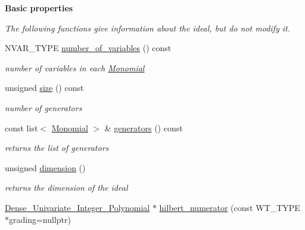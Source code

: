 \begin{Indent}\textbf{ Basic properties}\par
{\em The following functions give information about the ideal, but do not modify it. }\begin{DoxyCompactItemize}
\item 
\mbox{\label{class_monomial___ideal_a606b7dd86fedd848182e6a4a6d18c77d}} 
N\+V\+A\+R\+\_\+\+T\+Y\+PE \hyperlink{class_monomial___ideal_a606b7dd86fedd848182e6a4a6d18c77d}{number\+\_\+of\+\_\+variables} () const
\begin{DoxyCompactList}\small\item\em number of variables in each {\ttfamily \hyperlink{class_monomial}{Monomial}} \end{DoxyCompactList}\item 
\mbox{\label{class_monomial___ideal_a31f60f6a6370dc419d8083d3f3f469cc}} 
unsigned \hyperlink{class_monomial___ideal_a31f60f6a6370dc419d8083d3f3f469cc}{size} () const
\begin{DoxyCompactList}\small\item\em number of generators \end{DoxyCompactList}\item 
\mbox{\label{class_monomial___ideal_a2b7a092c8889479db32c76c0d2a65eae}} 
const list$<$ \hyperlink{class_monomial}{Monomial} $>$ \& \hyperlink{class_monomial___ideal_a2b7a092c8889479db32c76c0d2a65eae}{generators} () const
\begin{DoxyCompactList}\small\item\em returns the list of generators \end{DoxyCompactList}\item 
\mbox{\label{class_monomial___ideal_a3be382128a7fc5e42b3a1cbcc226ceb9}} 
unsigned \hyperlink{class_monomial___ideal_a3be382128a7fc5e42b3a1cbcc226ceb9}{dimension} ()
\begin{DoxyCompactList}\small\item\em returns the dimension of the ideal \end{DoxyCompactList}\item 
\hyperlink{class_dense___univariate___integer___polynomial}{Dense\+\_\+\+Univariate\+\_\+\+Integer\+\_\+\+Polynomial} $\ast$ \hyperlink{class_monomial___ideal_a4baf5da74da622fa61e048552e873733}{hilbert\+\_\+numerator} (const W\+T\+\_\+\+T\+Y\+PE $\ast$grading=nullptr)

\end{DoxyCompactItemize}
\end{Indent}
